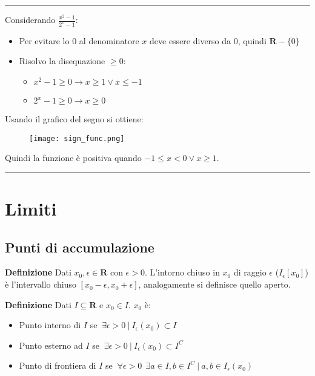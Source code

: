 \documentclass{article}
\begin{document}
\noindent\rule{\textwidth}{0.5pt}\newline

\noindent Considerando $\frac{x^2-1}{2^x-1}$:

\begin{itemize}
    \item Per evitare lo 0 al denominatore $x$ deve essere diverso da 0, quindi $\mathbf{R}-\{0\}$
    \item Risolvo la disequazione $\geq0$:
    \begin{itemize}
        \item $x^2-1\geq 0\rightarrow x\geq1\vee x\leq-1$
        \item $2^x-1\geq 0\rightarrow x\geq0$
    \end{itemize}
\end{itemize}

\noindent Usando il grafico del segno si ottiene:

\begin{figure}[ht]
    \centering
    \texttt{[image: sign\_func.png]}
    \label{fig:sign_func}
\end{figure}

\noindent Quindi la funzione è positiva quando $-1\leq x< 0\vee x\geq1$.

\noindent\rule{\textwidth}{0.5pt}

\newpage

\section{Limiti}

\subsection{Punti di accumulazione}

\textbf{Definizione} Dati $x_0,\epsilon\in\mathbf{R}$ con $\epsilon>0$. L'intorno chiuso in $x_0$ di raggio $\epsilon$ ($I_\epsilon[x_0]$) è l'intervallo chiuso $[x_0-\epsilon,x_0+\epsilon]$, analogamente si definisce quello aperto.\newline

\noindent\textbf{Definizione} Dati $I\subseteq\mathbf{R}$ e $x_0\in I$. $x_0$ è:
\begin{itemize}
    \item Punto interno di $I$ se $\ \exists\epsilon>0\ |\ I_\epsilon(x_0)\subset I$
    
    \item Punto esterno ad $I$ se $\ \exists\epsilon>0\ |\ I_\epsilon(x_0)\subset I^C$
    
    \item Punto di frontiera di $I$ se $\ \forall\epsilon>0 \ \ \exists a\in I,b\in I^C\ |\ a,b\in I_\epsilon(x_0)$\newline
    
\end{itemize}
\end{document}
